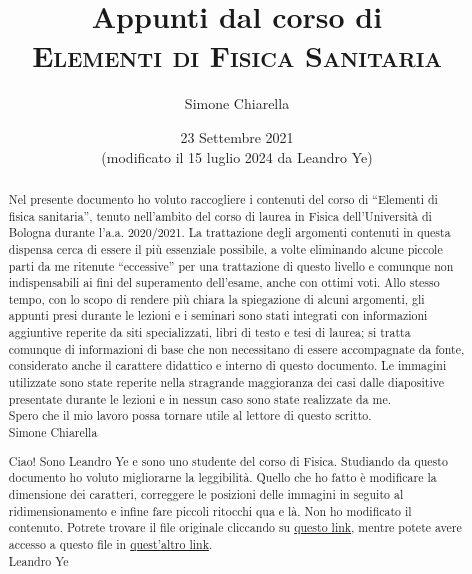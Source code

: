\documentclass[12pt]{report}
\title{Appunti dal corso di\\\vspace{10 pt} \textsc{ Elementi di Fisica Sanitaria}}
\author{Simone Chiarella}
\date{23 Settembre 2021\\\vspace{25pt}
(modificato il 15 luglio 2024 da Leandro Ye)}
\newcommand{\virgolette}[1]{``#1''}
\numberwithin{equation}{section}
\numberwithin{figure}{section}
\begin{document}
\maketitle

\begin{abstract}
\large{Nel presente documento ho voluto raccogliere i contenuti del corso di \virgolette{Elementi di fisica sanitaria}, tenuto nell'ambito del corso di laurea in Fisica dell'Università di Bologna durante l'a.a. 2020/2021.
La trattazione degli argomenti contenuti in questa dispensa cerca di essere il più essenziale possibile, a volte eliminando alcune piccole parti da me ritenute \virgolette{eccessive} per una trattazione di questo livello e comunque non indispensabili ai fini del superamento dell'esame, anche con ottimi voti.
Allo stesso tempo, con lo scopo di rendere più chiara la spiegazione di alcuni argomenti, gli appunti presi durante le lezioni e i seminari sono stati integrati con informazioni aggiuntive reperite da siti specializzati, libri di testo e tesi di laurea; si tratta comunque di informazioni di base che non necessitano di essere accompagnate da fonte, considerato anche il carattere didattico e interno di questo documento.
Le immagini utilizzate sono state reperite nella stragrande maggioranza dei casi dalle diapositive presentate durante le lezioni e in nessun caso sono state realizzate da me.\\
Spero che il mio lavoro possa tornare utile al lettore di questo scritto.\\

\hfill Simone Chiarella\\
\vspace{4cm}

\noindent Ciao! Sono Leandro Ye e sono uno studente del corso di Fisica. Studiando da questo documento ho voluto migliorarne la leggibilità. Quello che ho fatto è modificare la dimensione dei caratteri, correggere le posizioni delle immagini in seguito al ridimensionamento e infine fare piccoli ritocchi qua e là. Non ho modificato il contenuto. Potrete trovare il file originale cliccando su \href{https://github.com/sim1-99/medical-physics-notes/tree/main}{questo link}, mentre potete avere accesso a questo file in \href{https://www.overleaf.com/read/jdqnvbtnkhbg#03a66c}{quest'altro link}.\\

\hfill Leandro Ye}

\end{abstract}
\shipout\hbox{}

\tableofcontents












\end{document}
